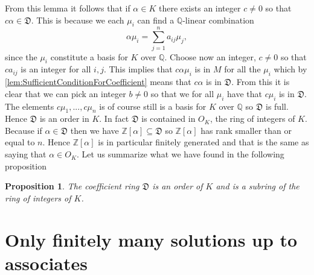 \documentclass{article}
\newtheorem{proposition}{Proposition}[section]
\newcommand{\mfrak}[1]{\mathfrak{#1}}
\newcommand{\mbb}[1]{\mathbb{#1}}
\begin{document}
From this lemma it follows that if $\alpha \in K$ there exists an integer $c \neq 0$ so that $c \alpha \in \mfrak D$. This is because we each $\mu_i$ can find a $\mbb Q$-linear combination
$$\alpha \mu_i = \sum_{j=1}^n a_{ij} \mu_j,$$
since the $\mu_i$ constitute a basis for $K$ over $\mbb Q$. Choose now an integer, $c \neq 0$ so that $c a_{ij}$ is an integer for all $i,j$. This implies that $c \alpha \mu_i$ is in $M$ for all the $\mu_i$ which by \cref{lem:SufficientConditionForCoefficient} means that $c \alpha$ is in $\mfrak D$. From this it is clear that we can pick an integer $b \neq 0$ so that we for all $\mu_i$ have that $c \mu_i$ is in $\mfrak D$. The elements $c \mu_1, ..., c\mu_n$ is of course still is a basis for $K$ over $\mbb Q$ so $\mfrak D$ is full. Hence $\mfrak D$ is an order in $K$. In fact $\mfrak D$ is contained in $O_K$, the ring of integers of $K$. Because if $\alpha \in \mfrak D$ then we have $\mbb Z[\alpha] \subseteq \mfrak D$ so $\mbb Z[\alpha]$ has rank smaller than or equal to $n$. Hence $\mbb Z[\alpha]$ is in particular finitely generated and that is the same as saying that $\alpha \in O_K$. Let us summarize what we have found in the following proposition
\begin{proposition}\label{prop: Coefficient ring properties}
    The coefficient ring $\mfrak D$ is an order of $K$ and is a subring of the ring of integers of $K$.
\end{proposition}

\section{Only finitely many solutions up to associates}
\end{document}
